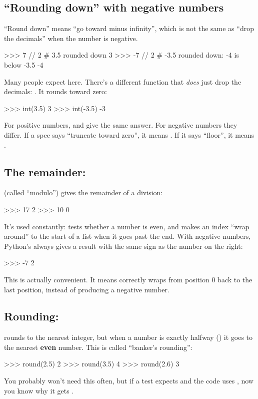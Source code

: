 \documentclass[10pt,a4paper]{article}
\begin{document}
\subsection{“Rounding down” with negative numbers}
“Round down” means “go toward minus infinity”, which is not the same as “drop the decimals” when the number is negative.
\begin{txtcode}
>>> 7 // 2      # 3.5 rounded down
3
>>> -7 // 2     # -3.5 rounded down: -4 is below -3.5
-4
\end{txtcode}
Many people expect  here. There’s a different function that \emph{does} just drop the decimals: . It rounds toward zero:
\begin{txtcode}
>>> int(3.5)
3
>>> int(-3.5)
-3
\end{txtcode}
For positive numbers, \code{/\allowbreak{}/\allowbreak{}} and  give the same answer. For negative numbers they differ. If a spec says “truncate toward zero”, it means . If it says “floor”, it means .
\subsection{The remainder: \code{\%}}
\code{\%} (called “modulo”) gives the remainder of a division:
\begin{txtcode}
>>> 17 %
2
>>> 10 %
0
\end{txtcode}
It’s used constantly:  tests whether a number is even, and  makes an index “wrap around” to the start of a list when it goes past the end. With negative numbers, Python’s \code{\%} always gives a result with the same sign as the number on the right:
\begin{txtcode}
>>> -7 %
2
\end{txtcode}
This is actually convenient. It means  correctly wraps from position 0 back to the last position, instead of producing a negative number.
\subsection{Rounding: }
 rounds to the nearest integer, but when a number is exactly halfway () it goes to the nearest \textbf{even} number. This is called “banker’s rounding”:
\begin{txtcode}
>>> round(2.5)
2
>>> round(3.5)
4
>>> round(2.6)
3
\end{txtcode}
You probably won’t need this often, but if a test expects  and the code uses , now you know why it gets .
\end{document}
